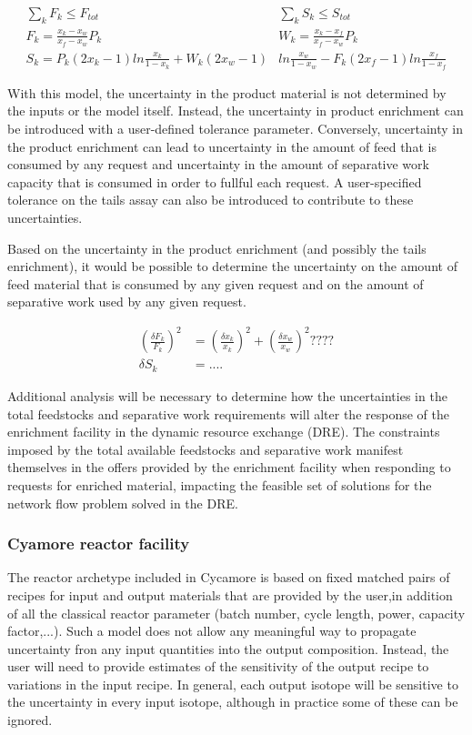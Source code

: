 \documentclass[dvips,12pt]{article}
\newcommand{\unc}[1]
{ \delta #1 }
\newcommand{\uncratio}[1]
{ \left(\frac{\unc{#1}}{#1}\right) }
\newcommand{\uncratiosq}[1]
{ \uncratio{#1}^2 }
\begin{document}
\begin{align*}
  \sum_k{F_k} \leq F_{tot}\qquad\qquad
  &\sum_k{S_k} \leq S_{tot}\\
  F_k = \frac{x_k - x_w}{x_f - x_w} P_k\qquad\qquad\qquad
  &W_k = \frac{x_k - x_f}{x_f - x_w} P_k\\
  S_k =  P_k\left(2x_k-1\right)ln\frac{x_k}{1-x_k}
         +W_k\left(2x_w-1\right)&ln\frac{x_w}{1-x_w}  
         -F_k\left(2x_f-1\right)ln\frac{x_f}{1-x_f}
\end{align*}

With this model, the uncertainty in the product
material is not determined by the inputs or the
model itself.  Instead, the uncertainty in product
enrichment can be introduced with a user-defined
tolerance parameter.  Conversely, uncertainty in
the product enrichment can lead to uncertainty in
the amount of feed that is consumed by any request
and uncertainty in the amount of separative work
capacity that is consumed in order to fullful each
request.  A user-specified tolerance on the tails
assay can also be introduced to contribute to
these uncertainties.

Based on the uncertainty in the product enrichment
(and possibly the tails enrichment), it would be
possible to determine the uncertainty on the
amount of feed material that is consumed by any
given request and on the amount of separative work
used by any given request.

\begin{align*}
  \uncratiosq{F_k} &= \uncratiosq{x_k} + \uncratiosq{x_w} ????\\
  \delta S_k &= ....
\end{align*}

Additional analysis will be necessary to determine
how the uncertainties in the total feedstocks and
separative work requirements will alter the
response of the enrichment facility in the dynamic
resource exchange (DRE).  The constraints imposed
by the total available feedstocks and separative
work manifest themselves in the offers provided by
the enrichment facility when responding to
requests for enriched material, impacting the
feasible set of solutions for the network flow
problem solved in the DRE.

\subsubsection{Cyamore reactor facility}

The reactor archetype included in Cycamore is
based on fixed matched pairs of recipes for input
and output materials that are provided by the
user,in addition of all the classical reactor
parameter (batch number, cycle length, power,
capacity factor,...).  Such a model does not allow
any meaningful way to propagate uncertainty fron
any input quantities into the output composition.
Instead, the user will need to provide estimates
of the sensitivity of the output recipe to
variations in the input recipe.  In general, each
output isotope will be sensitive to the
uncertainty in every input isotope, although in
practice some of these can be ignored.
\end{document}
